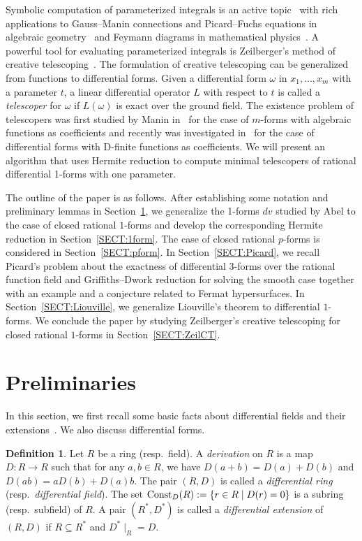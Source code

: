 \documentclass{amsart}
\theoremstyle{definition}
\newtheorem{defin}[thm]{Definition}
\numberwithin{equation}{section}
\numberwithin{thm}{section}
\newcommand{\Const}{\text{\rm Const}}
\begin{document}
Symbolic computation of parameterized integrals is an active topic~\cite{Raab2016} with rich applications to Gauss--Manin connections and Picard--Fuchs equations in algebraic geometry~\cite{Manin1958,Lairez2016} and Feymann diagrams in mathematical physics~\cite{muller-weinzierl-zayadeh, Schneider2021}. A powerful tool for evaluating parameterized integrals is Zeilberger's method of creative telescoping~\cite{AlmkvistZeilberger1990, Zeilberger1991}.  The formulation of creative telescoping can be generalized from functions to differential forms.  Given a differential form $\omega$ in $x_1, \ldots, x_m$ with a parameter $t$, a linear differential operator $L$ with respect to $t$ is called a \textit{telescoper} for $\omega$ if $L(\omega)$ is exact over the ground field. The existence problem of telescopers was first studied by Manin in~\cite{Manin1958} for the case of $m$-forms with algebraic functions as coefficients and recently was investigated in~\cite{ChenFengLiSinger2014, ChenFengLiSingerWatt2024} for the case of differential forms with D-finite functions as coefficients. We will present an algorithm {that uses Hermite reduction to compute minimal telescopers of rational differential 1-forms with one parameter.}

The outline of the paper is as follows. After establishing some notation and preliminary lemmas in Section~\ref{SECT:prelim}, we generalize the 1-forms $dv$ studied by Abel to the case of closed rational $1$-forms and develop the corresponding Hermite reduction in Section~\ref{SECT:1form}. The case of closed rational $p$-forms is considered in Section~\ref{SECT:pform}.  In Section~\ref{SECT:Picard}, we recall Picard's problem about  
the exactness of differential $3$-forms over the rational function field and Griffiths--Dwork reduction for solving the smooth case together with an example and a conjecture related to Fermat hypersurfaces.  In  Section~\ref{SECT:Liouville}, we generalize Liouville's theorem to differential $1$-forms. We conclude the paper by studying Zeilberger's creative telescoping for closed rational $1$-forms in Section~\ref{SECT:ZeilCT}.

\section{Preliminaries}
\label{SECT:prelim}
In this section, we first recall some basic facts about differential fields and their extensions~\cite{Bronstein}.  We also discuss differential forms.

\begin{defin}
Let $R$ be a ring (resp.\ field). A \textit{derivation} on $R$ is a map $D:R  \rightarrow R$ such that for any $a,b \in R$, we have $D(a+b)= D(a)+D(b)$ and $D(ab)=aD(b)+D(a)b$. The pair $(R,D)$ is called a \textit{differential ring} (resp.\ \textit{differential field}). The set $\Const_D(R) := \{r\in R\mid D(r)=0\}$ is a subring (resp.\ subfield) of $R$. A pair $(R^*, D^*)$ is called a \textit{differential extension} of $(R,D)$ if $R\subseteq R^*$ and $D^*{\mid_{R}} = D$.
\end{defin}
\end{document}

